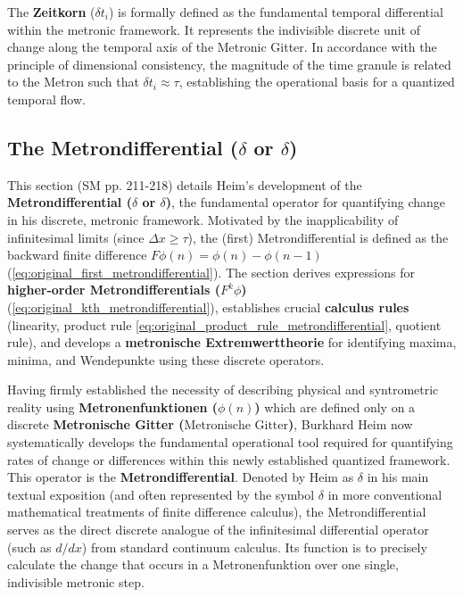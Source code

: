 \documentclass[12pt]{article}
\newcommand{\metron}{\tau}
\newcommand{\metronischegitter}{\text{Metronische Gitter}}
\newcommand{\metrondifferential}{\delta}
\newcommand{\metronenfunktion}{\phi(n)}
\newcommand{\zeitkorn}{\delta t_i}
\begin{document}
The \textbf{Zeitkorn} ($\zeitkorn$) is formally defined as the fundamental temporal differential within the metronic framework. It represents the indivisible discrete unit of change along the temporal axis of the Metronic Gitter. In accordance with the principle of dimensional consistency, the magnitude of the time granule is related to the Metron such that $\zeitkorn \approx \tau$, establishing the operational basis for a quantized temporal flow.

\subsection{The Metrondifferential (\texorpdfstring{\( \metrondifferential \)}{F} or \texorpdfstring{\( \delta \)}{delta})}
\label{sec:metrondifferential}

This section (SM pp. 211-218) details Heim's development of the \textbf{Metrondifferential (\(\metrondifferential\) or \( \delta \))}, the fundamental operator for quantifying change in his discrete, metronic framework. Motivated by the inapplicability of infinitesimal limits (since \( \Delta x \geq \metron \)), the (first) Metrondifferential is defined as the backward finite difference \( F\phi(n) = \phi(n) - \phi(n-1) \) (\eqref{eq:original_first_metrondifferential}). The section derives expressions for \textbf{higher-order Metrondifferentials (\(F^k\phi\))} (\eqref{eq:original_kth_metrondifferential}), establishes crucial \textbf{calculus rules} (linearity, product rule \eqref{eq:original_product_rule_metrondifferential}, quotient rule), and develops a \textbf{metronische Extremwerttheorie} for identifying maxima, minima, and Wendepunkte using these discrete operators.

Having firmly established the necessity of describing physical and syntrometric reality using \textbf{Metronenfunktionen (\( \metronenfunktion \))} which are defined only on a discrete \textbf{Metronische Gitter (\(\metronischegitter\))}, Burkhard Heim now systematically develops the fundamental operational tool required for quantifying rates of change or differences within this newly established quantized framework. This operator is the \textbf{Metrondifferential}. Denoted by Heim as \( \metrondifferential \) in his main textual exposition (and often represented by the symbol \( \delta \) in more conventional mathematical treatments of finite difference calculus), the Metrondifferential serves as the direct discrete analogue of the infinitesimal differential operator (such as \( d/dx \)) from standard continuum calculus. Its function is to precisely calculate the change that occurs in a Metronenfunktion over one single, indivisible metronic step.
\end{document}
